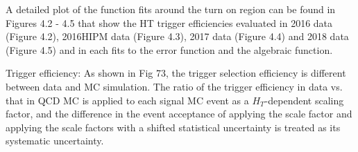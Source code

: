 A detailed plot of the function fits around the turn on region can be found in Figures 4.2 - 4.5 that show the HT trigger efficiencies evaluated in 2016 data (Figure 4.2), 2016HIPM data (Figure 4.3), 2017 data (Figure 4.4)  and 2018 data  (Figure 4.5)  and in each fits to the error function and the algebraic function.



Trigger efficiency: As shown in Fig 73, the trigger selection efficiency is different between data
and MC simulation. The ratio of the trigger efficiency in data vs. that in QCD MC is applied
to each signal MC event as a $H_T$-dependent scaling factor, and the difference in the event acceptance of applying the scale factor and applying the scale factors with a shifted statistical
uncertainty is treated as its systematic uncertainty.
